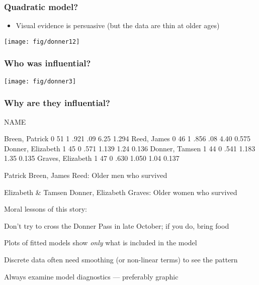 \begin{frame}
\frametitle{Quadratic model?}
\begin{itemize}
\item Visual evidence is persuasive (but the data are thin at older ages)
\end{itemize}
\begin{center}
  \texttt{[image: fig/donner12]}
\end{center}
\end{frame}

\begin{frame}
\frametitle{Who was influential?}

\begin{center}
  \texttt{[image: fig/donner3]}
\end{center}
\end{frame}

\begin{frame}[fragile]
\frametitle{Why are they influential?}
\begin{Output}[baselinestretch=0.9]
NAME              

Breen, Patrick      0  51  1 .921  .09  6.25  1.294
Reed, James         0  46  1 .856  .08  4.40  0.575
Donner, Elizabeth   1  45  0 .571  1.139  1.24  0.136
Donner, Tamsen      1  44  0 .541  1.183  1.35  0.135
Graves, Elizabeth   1  47  0 .630  1.050  1.04  0.137
\end{Output}
\begin{itemize*}
\item<1> Patrick Breen, James Reed: Older men who survived
\item<1> Elizabeth \& Tamsen Donner, Elizabeth Graves: Older women who survived
\item<2> Moral lessons of this story:
	\begin{itemize*}
		\item Don't try to cross the Donner Pass in late October; if you do, bring food
        \item Plots of fitted models show \emph{only} what is included in the model
		\item Discrete data often need smoothing (or non-linear terms) to see the pattern
        \item Always examine model diagnostics --- preferably graphic
	\end{itemize*}

\end{itemize*}

\end{frame}

\endinput
